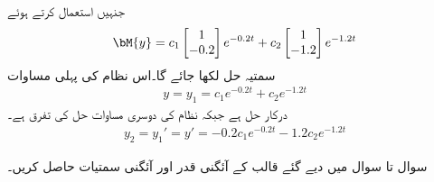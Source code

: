 جنہیں استعمال کرتے ہوئے
\begin{align*}
\bM{y}=c_1\begin{bmatrix} 1 \\ -0.2  \end{bmatrix}e^{-0.2 t}+c_2 \begin{bmatrix}  1 \\ -1.2 \end{bmatrix} e^{-1.2 t}
\end{align*}
سمتیہ حل لکھا جائے گا۔اس نظام کی پہلی مساوات
\begin{align*}
y=y_1=c_1e^{-0.2 t}+c_2e^{-1.2 t}
\end{align*}
درکار حل ہے جبکہ نظام کی دوسری مساوات حل کی تفرق ہے۔
\begin{align*}
y_2=y_1'=y'=-0.2c_1e^{-0.2 t}-1.2c_2e^{-1.2t}
\end{align*}

سوال  تا سوال  میں دیے گئے قالب کے آئگنی قدر اور آئگنی سمتیات حاصل کریں۔

